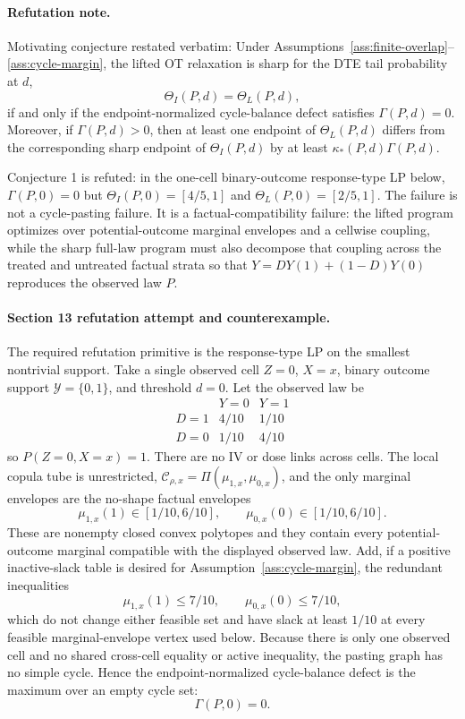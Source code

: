 \paragraph{Refutation note.}
Motivating conjecture restated verbatim:
Under Assumptions~\ref{ass:finite-overlap}--\ref{ass:cycle-margin}, the lifted OT relaxation is sharp for the DTE tail probability at \(d\),
\[
\Theta_I(P,d)=\Theta_L(P,d),
\]
if and only if the endpoint-normalized cycle-balance defect satisfies \(\Gamma(P,d)=0\).  Moreover, if \(\Gamma(P,d)>0\), then at least one endpoint of \(\Theta_L(P,d)\) differs from the corresponding sharp endpoint of \(\Theta_I(P,d)\) by at least \(\kappa_*(P,d)\Gamma(P,d)\).

Conjecture 1 is refuted: in the one-cell binary-outcome response-type LP below, \(\Gamma(P,0)=0\) but \(\Theta_I(P,0)=[4/5,1]\) and \(\Theta_L(P,0)=[2/5,1]\).
The failure is not a cycle-pasting failure.  It is a factual-compatibility failure: the lifted program optimizes over potential-outcome marginal envelopes and a cellwise coupling, while the sharp full-law program must also decompose that coupling across the treated and untreated factual strata so that \(Y=DY(1)+(1-D)Y(0)\) reproduces the observed law \(P\).

\paragraph{Section 13 refutation attempt and counterexample.}
The required refutation primitive is the response-type LP on the smallest nontrivial support.  Take a single observed cell \(Z=0\), \(X=x\), binary outcome support \(\mathcal Y=\{0,1\}\), and threshold \(d=0\).  Let the observed law be
\[
\begin{array}{c|cc}
 & Y=0 & Y=1\\ \hline
D=1 & 4/10 & 1/10\\
D=0 & 1/10 & 4/10
\end{array}
\]
so \(P(Z=0,X=x)=1\).  There are no IV or dose links across cells.  The local copula tube is unrestricted, \(\mathcal C_{\rho,x}=\Pi(\mu_{1,x},\mu_{0,x})\), and the only marginal envelopes are the no-shape factual envelopes
\[
\mu_{1,x}(1)\in[1/10,6/10],
\qquad
\mu_{0,x}(0)\in[1/10,6/10].
\]
These are nonempty closed convex polytopes and they contain every potential-outcome marginal compatible with the displayed observed law.  Add, if a positive inactive-slack table is desired for Assumption~\ref{ass:cycle-margin}, the redundant inequalities
\[
\mu_{1,x}(1)\le 7/10,\qquad \mu_{0,x}(0)\le 7/10,
\]
which do not change either feasible set and have slack at least \(1/10\) at every feasible marginal-envelope vertex used below.  Because there is only one observed cell and no shared cross-cell equality or active inequality, the pasting graph has no simple cycle.  Hence the endpoint-normalized cycle-balance defect is the maximum over an empty cycle set:
\[
\Gamma(P,0)=0.
\]

